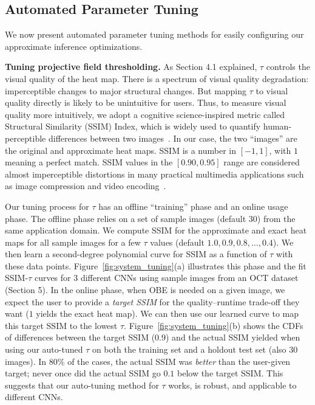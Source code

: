 \subsection{Automated Parameter Tuning}
We now present automated parameter tuning methods for easily configuring our approximate inference optimizations.

\vspace{2mm}
\noindent \textbf{Tuning projective field thresholding.}
As Section 4.1 explained, $\tau$ controls the visual quality of the heat map. There is a spectrum of visual quality degradation: imperceptible changes to major structural changes. But mapping $\tau$ to visual quality directly is likely to be unintuitive for users. Thus, to measure visual quality more intuitively, we adopt a cognitive science-inspired metric called Structural Similarity (SSIM) Index, which is widely used to quantify human-perceptible differences between two images~\cite{wang2004image}. In our case, the two ``images'' are the original and approximate heat maps. SSIM is a number in $[-1,1]$, with $1$ meaning a perfect match. SSIM values in the $[0.90,0.95]$ range are considered almost imperceptible distortions in many practical multimedia applications such as image compression and video encoding~\cite{wang2004image}.

Our tuning process for $\tau$ has an offline ``training'' phase and an online usage phase. The offline phase relies on a set of sample images (default $30$) from the same application domain. We compute SSIM for the approximate and exact heat maps for all sample images for a few $\tau$ values (default $1.0, 0.9, 0.8, \dots, 0.4$). We then learn a second-degree polynomial curve for SSIM as a function of $\tau$ with these data points. Figure~\ref{fig:system_tuning}(a) illustrates this phase and the fit SSIM-$\tau$ curves for 3 different CNNs using sample images from an OCT dataset (Section 5). In the online phase, when OBE is needed on a given image, we expect the user to provide a \textit{target SSIM} for the quality--runtime trade-off they want ($1$ yields the exact heat map). We can then use our learned curve to map this target SSIM to the lowest $\tau$. Figure~\ref{fig:system_tuning}(b) shows the CDFs of differences between the target SSIM ($0.9$) and the actual SSIM yielded when using our auto-tuned $\tau$ on both the training set and a holdout test set (also $30$ images). In $80\%$ of the cases, the actual SSIM was \textit{better} than the user-given target; never once did the actual SSIM go $0.1$ below the target SSIM. This suggests that our auto-tuning method for $\tau$ works, is robust, and applicable to different CNNs.

